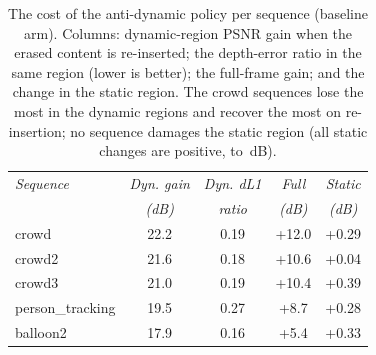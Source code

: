 \begin{table}[t]
\centering
\footnotesize
\setlength{\tabcolsep}{4pt}
\begin{tabular}{lcccc}
\toprule
\emph{Sequence} & \emph{Dyn. gain} & \emph{Dyn. dL1} & \emph{Full} & \emph{Static} \\
 & \emph{(dB)} & \emph{ratio} & \emph{(dB)} & \emph{(dB)} \\
\midrule
crowd & 22.2 & 0.19 & +12.0 & +0.29 \\
crowd2 & 21.6 & 0.18 & +10.6 & +0.04 \\
crowd3 & 21.0 & 0.19 & +10.4 & +0.39 \\
person\_tracking & 19.5 & 0.27 & +8.7 & +0.28 \\
balloon2 & 17.9 & 0.16 & +5.4 & +0.33 \\
\bottomrule
\end{tabular}
\caption{The cost of the anti-dynamic policy per sequence (baseline arm). Columns:
dynamic-region PSNR gain when the erased content is re-inserted; the depth-error
ratio in the same region (lower is better); the full-frame gain; and the change in
the static region. The crowd sequences lose the most in the dynamic regions and
recover the most on re-insertion; no sequence damages the static region (all static
changes are positive,  to \,dB).} %
\label{tab:dyncost-seq}
\end{table}
